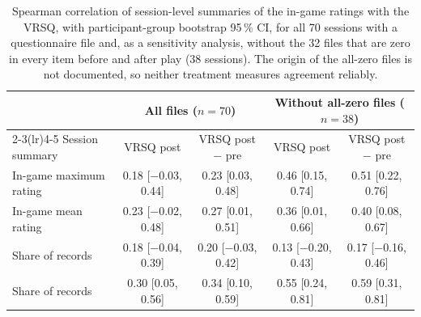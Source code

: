 \begin{table}[t]
\centering
\footnotesize
\caption{Spearman correlation of session-level summaries of the in-game ratings with the VRSQ, with participant-group bootstrap 95\,\% CI, for all 70 sessions with a questionnaire file and, as a sensitivity analysis, without the 32 files that are zero in every item before and after play (38 sessions). The origin of the all-zero files is not documented, so neither treatment measures agreement reliably.}
\label{tab:vrsq}
\setlength{\tabcolsep}{3pt}
\begin{tabular}{lcccc}
\toprule
 & \multicolumn{2}{c}{All files ($n=70$)} & \multicolumn{2}{c}{Without all-zero files ($n=38$)} \\
\cmidrule(lr){2-3}\cmidrule(lr){4-5}
Session summary & VRSQ post & VRSQ post $-$ pre & VRSQ post & VRSQ post $-$ pre \\
\midrule
In-game maximum rating & 0.18 [$-$0.03, 0.44] & 0.23 [0.03, 0.48] & 0.46 [0.15, 0.74] & 0.51 [0.22, 0.76] \\
In-game mean rating & 0.23 [$-$0.02, 0.48] & 0.27 [0.01, 0.51] & 0.36 [0.01, 0.66] & 0.40 [0.08, 0.67] \\
Share of records \sevone{} & 0.18 [$-$0.04, 0.39] & 0.20 [$-$0.03, 0.42] & 0.13 [$-$0.20, 0.43] & 0.17 [$-$0.16, 0.46] \\
Share of records \sevtwo{} & 0.30 [0.05, 0.56] & 0.34 [0.10, 0.59] & 0.55 [0.24, 0.81] & 0.59 [0.31, 0.81] \\
\bottomrule
\end{tabular}
\end{table}